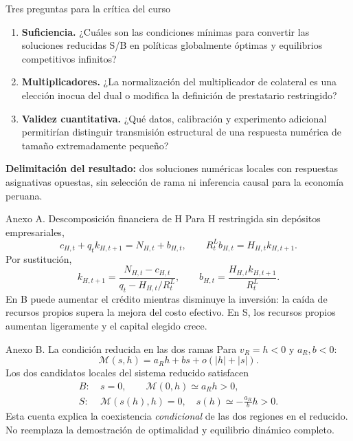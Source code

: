 \documentclass[aspectratio=169,11pt]{beamer}
\begin{document}
\begin{frame}{Tres preguntas para la crítica del curso}
\small
\begin{enumerate}
\item \textbf{Suficiencia.} ¿Cuáles son las condiciones mínimas para
convertir las soluciones reducidas S/B en políticas globalmente
óptimas y equilibrios competitivos infinitos?
\item \textbf{Multiplicadores.} ¿La normalización del multiplicador
de colateral es una elección inocua del dual o modifica la definición
de prestatario restringido?
\item \textbf{Validez cuantitativa.} ¿Qué datos, calibración y
experimento adicional permitirían distinguir transmisión estructural
de una respuesta numérica de tamaño extremadamente pequeño?
\end{enumerate}
\medskip
\textbf{Delimitación del resultado:} dos soluciones numéricas locales
con respuestas asignativas opuestas, sin selección de rama ni
inferencia causal para la economía peruana.
\end{frame}

\appendix
\begin{frame}{Anexo A. Descomposición financiera de H}
\small
Para H restringida sin depósitos empresariales,
\[
c_{H,t}+q_t k_{H,t+1}=N_{H,t}+b_{H,t},\qquad
R^L_t b_{H,t}=H_{H,t} k_{H,t+1}.
\]
Por sustitución,
\[
\boxed{k_{H,t+1}=
\frac{N_{H,t}-c_{H,t}}{q_t-H_{H,t}/R^L_t}},
\qquad
b_{H,t}=\frac{H_{H,t}k_{H,t+1}}{R^L_t}.
\]
En B puede aumentar el crédito mientras disminuye la inversión: la
caída de recursos propios supera la mejora del costo efectivo. En S,
los recursos propios aumentan ligeramente y el capital elegido crece.
\end{frame}

\begin{frame}{Anexo B. La condición reducida en las dos ramas}
\small
Para $v_R=h<0$ y $a_R,b<0$:
\[
\mathcal M(s,h)=a_R h+bs+o(|h|+|s|).
\]
Los dos candidatos locales del sistema reducido satisfacen
\[
\begin{aligned}
B:&\ s=0,\qquad \mathcal M(0,h)\simeq a_R h>0,\\
S:&\ \mathcal M(s(h),h)=0,\quad
s(h)\simeq-\frac{a_R}{b}h>0.
\end{aligned}
\]
Esta cuenta explica la coexistencia \emph{condicional} de las dos
regiones en el reducido. No reemplaza la demostración de optimalidad
y equilibrio dinámico completo.
\end{frame}
\end{document}
